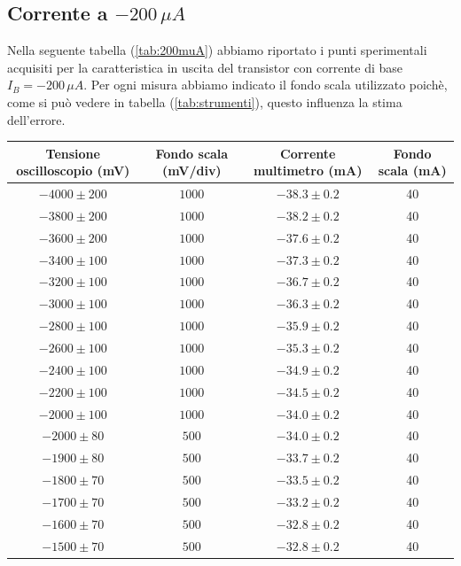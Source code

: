 \documentclass[]{article}
\begin{document}
\subsection{Corrente a $ -200\,\mu A $}
Nella seguente tabella (\ref{tab:200muA}) abbiamo riportato i punti sperimentali acquisiti per la caratteristica in uscita del transistor con corrente di base $ I_{B}= -200\,\mu A $. Per ogni misura abbiamo indicato il fondo scala utilizzato poichè, come si può vedere in tabella (\ref{tab:strumenti}), questo influenza la stima dell'errore.
	\begin{table}[H]
		\centering
	\begin{tabular}{|c|c|c|c|}
		\hline
		Tensione oscilloscopio (mV)& Fondo scala (mV/div) & Corrente multimetro (mA) &Fondo scala (mA)\\
		\hline
		$ -4000\pm 200 $ &$ 1000 $ & $ -38.3\pm 0.2 $ &40\\
		\hline
		$-3800\pm200 $ &$ 1000 $ & $ -38.2\pm0.2 $ &40 \\
		\hline
		$ -3600\pm 200 $ &$ 1000 $ & $ -37.6\pm 0.2 $ &40 \\
		\hline
		$ -3400\pm 100 $ &$ 1000 $ & $ -37.3\pm 0.2 $ &40 \\
		\hline
		$ -3200\pm 100 $ &$ 1000 $ & $-36.7\pm 0.2$ &40 \\
		\hline
		$ -3000\pm 100 $ &$ 1000 $ & $ -36.3\pm 0.2 $ &40 \\
		\hline
		$ -2800\pm 100 $ &$ 1000 $ & $ -35.9\pm 0.2 $ &40 \\
		\hline
		$ -2600\pm 100 $ &$ 1000 $ & $ -35.3\pm 0.2 $ &40 \\
		\hline
		$ -2400\pm 100 $ &$ 1000 $ & $ -34.9\pm 0.2 $ &40 \\
		\hline
		$ -2200\pm 100 $ &$ 1000 $ & $ -34.5\pm 0.2 $ &40 \\
		\hline
		$ -2000\pm 100 $ &$ 1000 $ & $ -34.0\pm0.2 $  &40\\
		\hline
		$ -2000\pm 80 $ &$ 500 $ & $ -34.0\pm0.2 $  &40\\
		\hline
		$ -1900\pm 80 $ &$ 500 $ & $ -33.7\pm0.2 $  &40\\
		\hline
		$ -1800\pm 70 $ &$ 500 $ & $ -33.5\pm 0.2 $ &40 \\
		\hline
		$ -1700\pm 70 $ &$ 500 $ & $ -33.2\pm 0.2 $ &40 \\
		\hline
		$ -1600\pm 70 $ &$ 500 $ & $ -32.8\pm 0.2 $ &40 \\
		\hline
		$ -1500\pm 70 $ &$ 500 $ & $ -32.8\pm 0.2 $ &40 \\
		\hline

\end{tabular}
\end{table}
\end{document}
